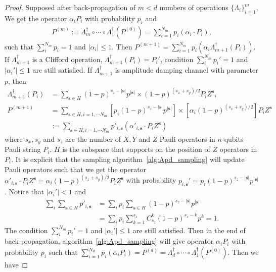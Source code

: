 \documentclass[aps,%
twocolumn,%
floatfix,%
pra,%
amsfonts,%
longbibliography,%
groupedaddress,%
superscriptaddress]{revtex4-2}%
\newcommand{\1}{\mathbbm{1}}
\begin{document}
\begin{proof}
    Supposed after back-propagation of $m < d$ numbers of operations $\{\Lambda_i\}_{i =1}^m$, We get the operator $\alpha_i P_i$ with probability $p_i$ and 
    \begin{align}
        P^{(m)} := \Lambda_m^\dagger\circ \cdots \circ\Lambda_1^\dagger(P^{(0)}) = \sum_{i = 1}^{N_m} p_i (\alpha_i \cdot P_i),
    \end{align}
    such that $\sum_i^{N_m} p_i = 1$ and $|\alpha_i|\leq 1 $. Then $     P^{(m+1)}= \sum_{i = 1}^{N_m} p_i (\alpha_i \Lambda_{m+1}^\dagger(P_i))$. 
    If $\Lambda_{m+1}^\dagger$ is a Clifford operation, $\Lambda_{m+1}^\dagger(P_i) = P_i'$, condition $\sum_i^{N_m} p_i' = 1$ and $|\alpha_i'|\leq 1 $ are still satisfied.
    If $\Lambda_{m+1}^\dagger$ is amplitude damping channel with parameter $p$, then
    \begin{align}
        \Lambda_{m+1}^\dagger(P_i) &= \sum_{\mathbf{s} \in H} (1-p)^{s_z - |\mathbf{s}|} p^{|\mathbf{s}|} \times (1 - p)^{(s_x+ s_y)/2}P_i Z^{\mathbf{s}},\\
         P^{(m+1)} &= \sum_{\mathbf{s} \in H, i = 1, \cdots N_m} \left[p_i(1-p)^{s_z - |\mathbf{s}|} p^{|\mathbf{s}|}\right] \times \left[\alpha_i(1 - p)^{(s_x+ s_y)/2}\right]P_i Z^{\mathbf{s}}\\
         &:= \sum_{\mathbf{s} \in H, i = 1, \cdots N_m} p'_{i,\mathbf{s}} (\alpha'_{i, \mathbf{s}}\cdot P_i Z^{\mathbf{s}})
    \end{align}
    where $s_x,s_y$ and $s_z$ are the number of $X,Y$ and $Z$ Pauli operators in $n$-qubits Pauli string $P_i$. 
    $H$ is the subspace that supports on the position of $Z$ operators in $P_i$.  
    It is explicit that the sampling algorithm~\ref{alg:Apd_sampling} will update Pauli operators such that we get the operator $ \alpha'_{i, \mathbf{s}}\cdot P_i Z^{\mathbf{s}} =\alpha_i (1 - p)^{(s_x+ s_y)/2}P_i Z^{\mathbf{s}}$ with probability $p_{i, \mathbf{s}}' = p_i (1-p)^{s_z - |\mathbf{s}|} p^{|\mathbf{s}|}$.
    Notice that $|\alpha_i'|< 1 $ and 
    \begin{align}
        \sum_i\sum_{\mathbf{s} \in H} p'_{i, \mathbf{s}} &=\sum_i p_i \sum_{\mathbf{s} \in H}(1-p)^{s_z - |\mathbf{s}|} p^{|\mathbf{s}|}\\
        &=\sum_i p_i \sum_{k=1}^{s_z}C_{s_z}^{k}(1-p)^{s_z - k} p^{k} = 1.
    \end{align}
    The condition  $\sum_i^{N_m} p_i' = 1$ and $|\alpha_i'|\leq 1 $ are still satisfied.
    Then in the end of back-propagation, algorithm~\ref{alg:Apd_sampling} will give operator $\alpha_i P_i$ with probability $p_i$ such that $\sum_{i = 1}^{N_d} p_i (\alpha_iP_i) =P^{(d)} =  \Lambda_d^\dagger\circ \cdots \circ\Lambda_1^\dagger(P^{(0)})$. Then we have

\end{proof}
\end{document}
